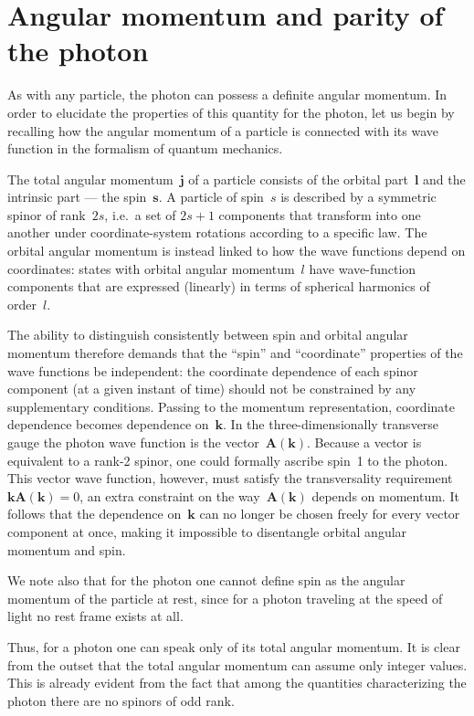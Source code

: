 \section{Angular momentum and parity of the photon}

As with any particle, the photon can possess a definite angular momentum. In order to elucidate the properties of this quantity for the photon, let us begin by recalling how the angular momentum of a particle is connected with its wave function in the formalism of quantum mechanics.

The total angular momentum~$\mathbf{j}$ of a particle consists of the orbital part~$\mathbf{l}$ and the intrinsic part --- the spin~$\mathbf{s}$. A particle of spin~$s$ is described by a symmetric spinor of rank~$2s$, i.e.\ a set of $2s + 1$ components that transform into one another under coordinate-system rotations according to a specific law. The orbital angular momentum is instead linked to how the wave functions depend on coordinates: states with orbital angular momentum~$l$ have wave-function components that are expressed (linearly) in terms of spherical harmonics of order~$l$.

The ability to distinguish consistently between spin and orbital angular momentum therefore demands that the ``spin'' and ``coordinate'' properties of the wave functions be independent: the coordinate dependence of each spinor component (at a given instant of time) should not be constrained by any supplementary conditions.
Passing to the momentum representation, coordinate dependence becomes dependence on~$\mathbf{k}$. In the three-dimensionally transverse gauge the photon wave function is the vector~$\mathbf{A}(\mathbf{k})$. Because a vector is equivalent to a rank-2 spinor, one could formally ascribe spin~1 to the photon. This vector wave function, however, must satisfy the transversality requirement $\mathbf{kA}(\mathbf{k}) = 0$, an extra constraint on the way~$\mathbf{A}(\mathbf{k})$ depends on momentum. It follows that the dependence on~$\mathbf{k}$ can no longer be chosen freely for every vector component at once, making it impossible to disentangle orbital angular momentum and spin.

We note also that for the photon one cannot define spin as the angular momentum of the particle at rest, since for a photon traveling at the speed of light no rest frame exists at all.

Thus, for a photon one can speak only of its total angular momentum. It is clear from the outset that the total angular momentum can assume only integer values. This is already evident from the fact that among the quantities characterizing the photon there are no spinors of odd rank.

